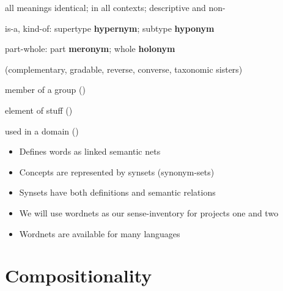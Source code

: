 \documentclass[a4paper,landscape,headrule,footrule,xetex]{foils}
\begin{document}
\begin{description}
\item {}  all meanings identical; in all contexts; descriptive and non-
\item {} is-a, kind-of: supertype \textbf{hypernym}; subtype \textbf{hyponym}
\item {} part-whole: part \textbf{meronym}; whole \textbf{holonym}
\item {} (complementary, gradable, reverse, converse, taxonomic sisters)
\item {} member of a group ()
\item {} element of stuff ()
\item {}  used in a domain ()
\end{description}


\begin{itemize}
\item Defines words as linked semantic nets
\item Concepts are represented by synsets (synonym-sets)
\item Synsets have both definitions and semantic relations
\item We will use wordnets as our sense-inventory for projects one and two
\item Wordnets are available for many languages

\end{itemize}

\section{Compositionality}



\end{document}
